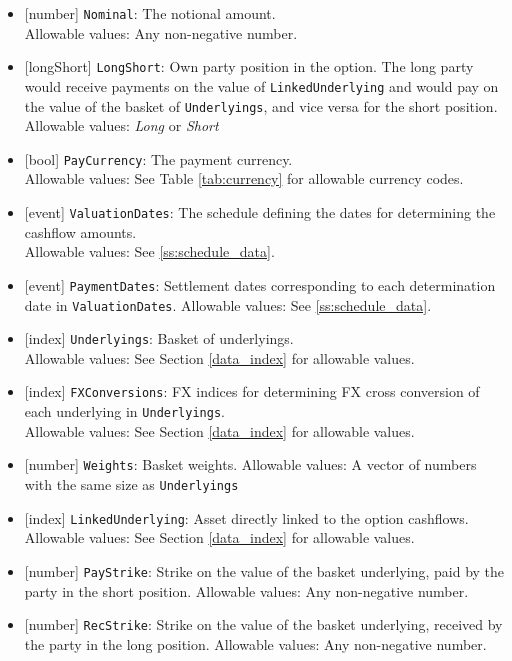 \begin{itemize}
  \item{}[number] \lstinline!Nominal!: The notional amount. \\
  Allowable values: Any non-negative number.
  \item{}[longShort] \lstinline!LongShort!: Own party position in the option. The long party
  would receive payments on the value of \lstinline!LinkedUnderlying! and would pay on the
  value of the basket of \lstinline!Underlyings!, and vice versa for the short position. \\
  Allowable values: \emph{Long} or \emph{Short}
  \item{}[bool] \lstinline!PayCurrency!: The payment currency. \\
  Allowable values: See Table \ref{tab:currency} for allowable currency codes.
  \item{}[event] \lstinline!ValuationDates!: The schedule defining the dates for determining
  the cashflow amounts. \\
  Allowable values: See \ref{ss:schedule_data}.
  \item{}[event] \lstinline!PaymentDates!: Settlement dates corresponding to each determination date
  in \lstinline!ValuationDates!.
  Allowable values: See \ref{ss:schedule_data}.
  \item{}[index] \lstinline!Underlyings!: Basket of underlyings. \\
  Allowable values: See Section \ref{data_index} for allowable values.
  \item{}[index] \lstinline!FXConversions!: FX indices for determining FX cross conversion of each
  underlying in \lstinline!Underlyings!. \\
  Allowable values: See Section \ref{data_index} for allowable values.
  \item{}[number] \lstinline!Weights!: Basket weights.
  Allowable values: A vector of numbers with the same size as \lstinline!Underlyings!
  \item{}[index] \lstinline!LinkedUnderlying!: Asset directly linked to the option cashflows. \\
  Allowable values: See Section \ref{data_index} for allowable values.
  \item{}[number] \lstinline!PayStrike!: Strike on the value of the basket underlying, paid by the
  party in the short position.
  Allowable values: Any non-negative number.
  \item{}[number] \lstinline!RecStrike!: Strike on the value of the basket underlying, received by
  the party in the long position.
  Allowable values: Any non-negative number.
\end{itemize}

